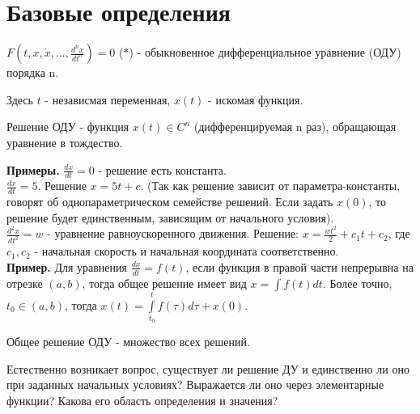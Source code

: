 \section{Базовые определения}

\begin{defin}
    $F(t,x,\dot{x},...,\frac{d^n x}{dt^n})=0$ (*) - обыкновенное
    дифференциальное уравнение (ОДУ) порядка n.
\end{defin}
Здесь $t$ - независмая переменная,  $x(t)$ - искомая функция.
\begin{defin}
Решение ОДУ - функция $x(t)\in C^n$ (дифференцируемая n раз), обращающая
уравнение в тождество.
\end{defin}
\textbf{Примеры.} $\frac{dx}{dt}=0 $ - решение есть константа.\\
$\frac{dx}{dt}=5$. Решение $x=5t+c$.
(Так как решение зависит от параметра-константы, говорят об однопараметрическом
семействе решений. Если задать $x(0)$, то решение будет единственным, 
зависящим от начального условия).\\
$\frac{d^2 x}{dt^2}=w$ - уравнение равноускоренного 
движения. Решение: $x=\frac{wt^2}{2}+c_1t+c_2$, где  $c_1,c_2$ - начальная 
скорость и начальная координата соответственно. \\
\textbf{Пример.} Для уравнения $\frac{dx}{dt} =f(t)$, если 
функция в правой части непрерывна на отрезке $(a,b)$, тогда общее решение
имеет вид $x=\int f(t)dt$. Более точно, $t_0\in(a,b)$, тогда
$x(t)=\int\limits^t_{t_0}f(\tau)d\tau+x(0)$.
\begin{defin}
Общее решение ОДУ - множество всех решений.
\end{defin}
Естественно возникает вопрос, существует ли решение ДУ и единственно ли оно
при заданных начальных условиях? Выражается ли оно через элементарные функции?
Какова его область определения и значения?

